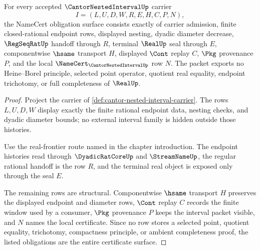 \begin{theorem}
\label{thm:cantor-nested-interval-namecert-obligations}
For every accepted $\CantorNestedIntervalUp$ carrier
$$
I=(L,U,D,W,R,E,H,C,P,N),
$$
the NameCert obligation surface consists exactly of carrier admission, finite closed-rational endpoint rows, displayed nesting, dyadic diameter decrease, $\RegSeqRatUp$ handoff through $R$, terminal $\RealUp$ seal through $E$, componentwise $\hsame$ transport $H$, displayed $\Cont$ replay $C$, $\Pkg$ provenance $P$, and the local $\NameCert_{\CantorNestedIntervalUp}$ row $N$. The packet exports no Heine--Borel principle, selected point operator, quotient real equality, endpoint trichotomy, or full completeness of $\RealUp$.
\end{theorem}
\begin{proof}
Project the carrier of \autoref{def:cantor-nested-interval-carrier}. The rows $L,U,D,W$ display exactly the finite rational endpoint data, nesting checks, and dyadic diameter bounds; no external interval family is hidden outside those histories.

Use the real-frontier route named in the chapter introduction. The endpoint histories read through $\DyadicRatCoreUp$ and $\StreamNameUp$, the regular rational handoff is the row $R$, and the terminal real object is exposed only through the seal $E$.

The remaining rows are structural. Componentwise $\hsame$ transport $H$ preserves the displayed endpoint and diameter rows, $\Cont$ replay $C$ records the finite window used by a consumer, $\Pkg$ provenance $P$ keeps the interval packet visible, and $N$ names the local certificate. Since no row stores a selected point, quotient equality, trichotomy, compactness principle, or ambient completeness proof, the listed obligations are the entire certificate surface.
\end{proof}

